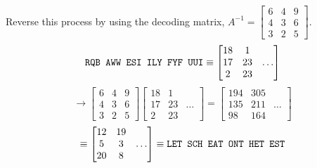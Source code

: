 \begin{activity}{10}
Reverse this process by using the decoding matrix,
\(A^{-1}=\begin{bmatrix}6&4&9\\4&3&6\\3&2&5\end{bmatrix}\).
\[
\text{\texttt{RQB AWW ESI ILY FYF UUI}}
\equiv
\begin{bmatrix}18&1\\17&23&\dots\\2&23\end{bmatrix}
\]
\[
\to
\begin{bmatrix}6&4&9\\4&3&6\\3&2&5\end{bmatrix}\begin{bmatrix}18&1\\17&23&\dots\\2&23\end{bmatrix}
=
\begin{bmatrix}194&305\\135&211&\dots\\98&164\end{bmatrix}
\]
\[
\equiv
\begin{bmatrix}12&19\\5&3&\dots\\20&8\end{bmatrix}
\equiv
\text{\texttt{LET SCH EAT ONT HET EST}}
\]
\end{activity}

